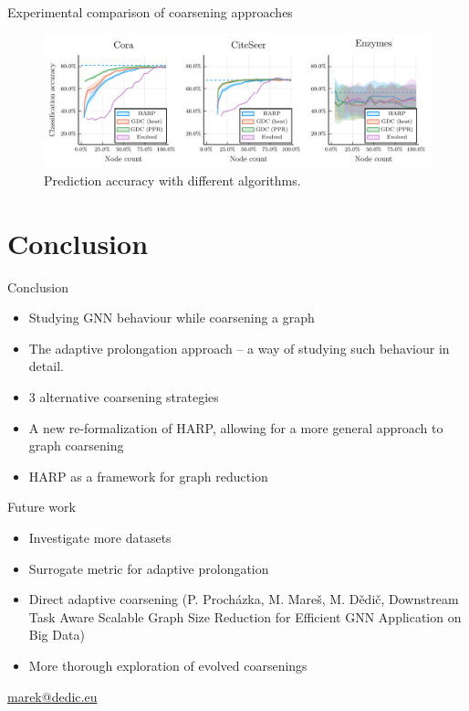 \documentclass[10pt]{beamer}
\begin{document}
\begin{frame}{Experimental comparison of coarsening approaches}
	\begin{figure}
		\centering
		\includegraphics[width=\textwidth]{images/coarsening-algorithms/coarsening-algorithms.pdf}
		\caption{Prediction accuracy with different algorithms.}
	\end{figure}
\end{frame}

\section{Conclusion}

\begin{frame}{Conclusion}
	\centering
	\begin{itemize}
		\item Studying GNN behaviour while coarsening a graph
		\item The adaptive prolongation approach -- a way of studying such behaviour in detail.
		\item 3 alternative coarsening strategies
		\item A new re-formalization of HARP, allowing for a more general approach to graph coarsening
		\item HARP as a framework for graph reduction
	\end{itemize}
\end{frame}

\begin{frame}{Future work}
	\centering
	\begin{itemize}
		\item Investigate more datasets
		\item Surrogate metric for adaptive prolongation
		\item Direct adaptive coarsening (P. Procházka, M. Mareš, M. Dědič, Downstream Task Aware Scalable Graph Size Reduction for Efficient GNN Application on Big Data)
		\item More thorough exploration of evolved coarsenings
	\end{itemize}
\end{frame}

\begin{frame}
	\titlepage
	\hfill{}\url{marek@dedic.eu}\hspace{1cm}
	\vspace{0.5cm}
\end{frame}
\end{document}
